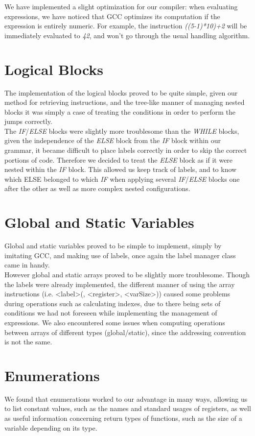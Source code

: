 \documentclass{scrartcl}
\begin{document}
We have implemented a slight optimization for our compiler: when evaluating expressions, we have noticed that GCC optimizes its computation if the expression is entirely numeric. For example, the instruction \emph{((5-1)*10)+2} will be immediately evaluated to \emph{42}, and won't go through the usual handling algorithm.

\section{Logical Blocks}
The implementation of the logical blocks proved to be quite simple, given our method for retrieving instructions, and the tree-like manner of managing nested blocks it was simply a case of treating the conditions in order to perform the jumps correctly.\\

The \emph{IF}/\emph{ELSE} blocks were slightly more troublesome than the \emph{WHILE} blocks, given the independence of the
\emph{ELSE} block from the \emph{IF} block within our grammar, it became difficult to place labels correctly in order to skip the correct portions of code. Therefore we decided to treat the \emph{ELSE} block as if it were nested within the \emph{IF} block. This allowed us keep track of labels, and to know which ELSE belonged to which \emph{IF} when applying several \emph{IF}/\emph{ELSE} blocks one after the other as well as more complex nested configurations.

\section{Global and Static Variables}
Global and static variables proved to be simple to implement, simply by imitating GCC, and making use of labels, once again the label manager class came in handy.\\

However global and static arrays proved to be slightly more troublesome. Though the labels were already implemented, the different manner of using the array instructions (i.e. <label>(, <register>, <varSize>)) caused some problems during operations such as calculating indexes, due to there being sets of conditions we had not foreseen while implementing the management of expressions. We also encountered some issues when computing operations between arrays of different types (global/static), since the addressing convention is not the same.

\section{Enumerations}
We found that enumerations worked to our advantage in many ways, allowing us to list constant values, such as the names and standard usages of registers, as well as useful information concerning return types of functions, such as the size of a variable depending on its type.\\
\end{document}
